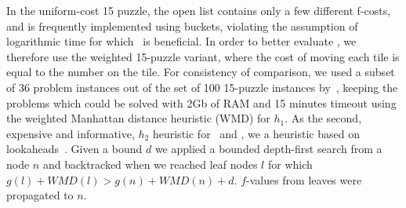 In the uniform-cost 15 puzzle, the open list contains only a few
different f-costs, and is frequently implemented using buckets,
violating the assumption of logarithmic time for which \rationallazyastar~is
beneficial. In order to better evaluate \rationallazyastar, we therefore use
the weighted 15-puzzle variant, where the cost of moving each tile is
equal to the number on the tile.  For consistency of comparison, we
used a subset of 36 problem instances out of the set of 100 15-puzzle
instances by~\cite{BFID85}, keeping the problems which could be solved
with 2Gb of RAM and 15 minutes timeout using the weighted Manhattan
distance heuristic (WMD) for $h_1$. As the second, expensive and informative,
$h_2$ heuristic for \lazyastar~and \rationallazyastar, we  a heuristic
based on lookaheads~\cite{DBLP:conf/aaai/SternKFH10}. Given a bound
$d$ we applied a bounded depth-first search from a node $n$ and
backtracked when we reached leaf nodes $l$ for which $g(l)+WMD(l)>
g(n)+WMD(n)+d$. $f$-values from leaves were propagated to $n$.

